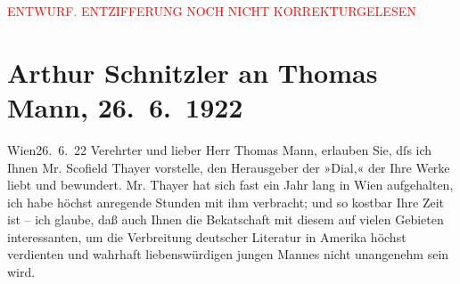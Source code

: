 
\begin{center}
            \textcolor{red}{ENTWURF. ENTZIFFERUNG NOCH NICHT KORREKTURGELESEN}
                      \end{center}
            
               \section[Arthur Schnitzler an Thomas Mann, 26. 6. 1922]{ Arthur Schnitzler an Thomas Mann, 26. 6. 1922}\nopagebreak{}\rehead{ }\begin{ledgroupsized}[t]{13cm}\normalsize\beginnumbering{} \toendnotes[C]{\smallbreak\pagebreak[2]} 
\toendnotes[C]{\smallbreak}\pstart
           \raggedleft{}{\pb}Wien26. 6. 22\pend
           \pstart
           Verehrter und lieber Herr Thomas Mann, erlauben Sie, dſs ich
                    Ihnen Mr. Scofield Thayer vorstelle, den
                    Herausgeber der »Dial,« der Ihre Werke liebt
                    und bewundert. Mr. Thayer hat sich fast ein
                    Jahr lang in Wien aufgehalten, ich habe höchst
                    anregende Stunden mit ihm verbracht; und so kostbar Ihre Zeit ist – ich glaube,
                    daß auch Ihnen die Beka{\geminationn}tschaft mit diesem auf
                    vielen Gebieten interessanten, um die {\pb}Verbreitung deutscher Literatur in Amerika
                    höchst verdienten und wahrhaft liebenswürdigen jungen Mannes nicht unangenehm sein wird.\pend

\end{ledgroupsized}
